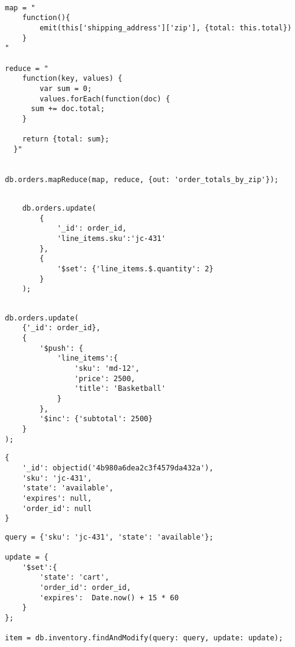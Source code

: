 \medskip
\begin{lstlisting}[caption= Ejemplo de comando \mapReduce., label=source:javascript:example_aggregation_mongodb]

map = "
    function(){
        emit(this['shipping_address']['zip'], {total: this.total})
    }
"

reduce = "
    function(key, values) {
        var sum = 0;
        values.forEach(function(doc) {
      sum += doc.total;
    }

    return {total: sum};
  }"


db.orders.mapReduce(map, reduce, {out: 'order_totals_by_zip'});

\end{lstlisting}



\medskip
\begin{lstlisting}[caption= Ejemplo de uso de \positionOperatorDB., label=source:javascript:example_incrementing_quality_mongodb]

    db.orders.update(
        {
            '_id': order_id,
            'line_items.sku':'jc-431'
        },
        {
            '$set': {'line_items.$.quantity': 2}
        }
    );
        
\end{lstlisting}


\medskip
\begin{lstlisting}[caption= Ejemplo del operador \pushOperatorDB., label=source:javascript:example_push_operator_mongodb]
db.orders.update(
    {'_id': order_id},
    {
        '$push': {
            'line_items':{
                'sku': 'md-12',
                'price': 2500,
                'title': 'Basketball'
            }
        },
        '$inc': {'subtotal': 2500}
    }
);
\end{lstlisting}


\medskip
\begin{lstlisting}[caption= Ejemplo de \documentDB para un producto., label=source:javascript:example_document_inventory_mongodb]
{
    '_id': objectid('4b980a6dea2c3f4579da432a'),
    'sku': 'jc-431',
    'state': 'available',
    'expires': null,
    'order_id': null
}
\end{lstlisting}


\medskip
\begin{lstlisting}[caption= Marcando un producto con tiempo de espiración., label=source:javascript:example_add_inventory_expiartion_mongodb]
query = {'sku': 'jc-431', 'state': 'available'};

update = {
    '$set':{
        'state': 'cart',
        'order_id': order_id,
        'expires':  Date.now() + 15 * 60
    }
};

item = db.inventory.findAndModify(query: query, update: update);
\end{lstlisting}


